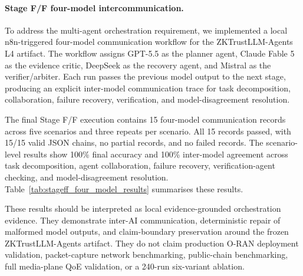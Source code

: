 \paragraph{Stage F/F four-model intercommunication.}
To address the multi-agent orchestration requirement, we implemented a local n8n-triggered four-model communication workflow for the ZKTrustLLM-Agents L4 artifact. The workflow assigns GPT-5.5 as the planner agent, Claude Fable 5 as the evidence critic, DeepSeek as the recovery agent, and Mistral as the verifier/arbiter. Each run passes the previous model output to the next stage, producing an explicit inter-model communication trace for task decomposition, collaboration, failure recovery, verification, and model-disagreement resolution.

The final Stage F/F execution contains 15 four-model communication records across five scenarios and three repeats per scenario. All 15 records passed, with 15/15 valid JSON chains, no partial records, and no failed records. The scenario-level results show 100\% final accuracy and 100\% inter-model agreement across task decomposition, agent collaboration, failure recovery, verification-agent checking, and model-disagreement resolution. Table~\ref{tab:stageff_four_model_results} summarises these results.

These results should be interpreted as local evidence-grounded orchestration evidence. They demonstrate inter-AI communication, deterministic repair of malformed model outputs, and claim-boundary preservation around the frozen ZKTrustLLM-Agents artifact. They do not claim production O-RAN deployment validation, packet-capture network benchmarking, public-chain benchmarking, full media-plane QoE validation, or a 240-run six-variant ablation.
